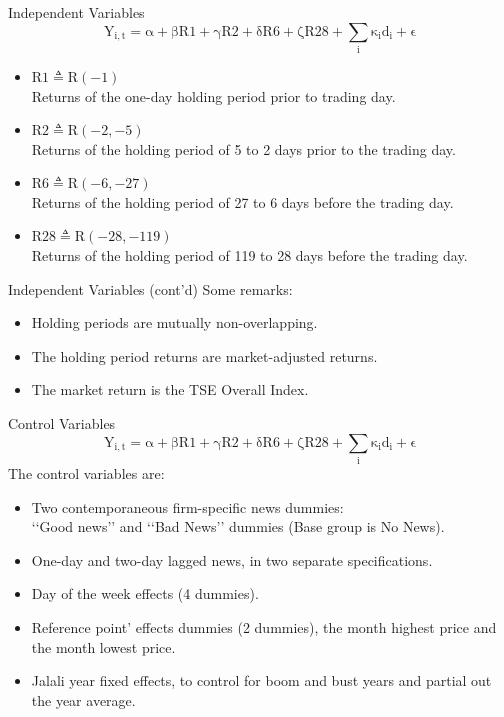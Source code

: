 \documentclass{beamer}
\begin{document}
\begin{frame}{Independent Variables}
    \[
        \mathrm{Y_{i,t} = \alpha + \beta R1 + \gamma R2 + \delta R6 + \zeta R28 + \sum_i \kappa_i d_i + \epsilon}
    \]
    \begin{itemize}
        \item \(\mathrm{R1} \triangleq   \mathrm{R(-1)} \)
              \\ Returns of the one-day holding period prior to trading day.
        \item \(\mathrm{R2} \triangleq   \mathrm{R(-2, -5)} \)
              \\ Returns of the holding period of 5 to 2 days prior to the trading day.
        \item \(\mathrm{R6} \triangleq   \mathrm{R(-6, -27)} \)
              \\ Returns of the holding period of 27 to 6 days before the trading day.
        \item \(\mathrm{R28} \triangleq  \mathrm{R(-28, -119)} \)
              \\ Returns of the holding period of 119 to 28 days before the trading day.
    \end{itemize}
\end{frame}

\begin{frame}{Independent Variables (cont'd)}
    Some remarks:
    \begin{itemize}
        \item Holding periods are mutually non-overlapping.
        \item The holding period returns are market-adjusted returns.
        \item The market return is the TSE Overall Index.
    \end{itemize}
\end{frame}

\begin{frame}{Control Variables}
    \[
        \mathrm{Y_{i,t} = \alpha + \beta R1 + \gamma R2 + \delta R6 + \zeta R28 + \sum_i \kappa_i d_i + \epsilon}
    \]
    The control variables are:
    \begin{itemize}
        \item Two contemporaneous firm-speciﬁc news dummies:\\
              ‘‘Good news’’ and ‘‘Bad News’’ dummies (Base group is No News).
        \item One-day and two-day lagged news, in two separate specifications.
        \item Day of the week effects (4 dummies).
        \item Reference point’ effects dummies (2 dummies), the month highest price and the month lowest price.
        \item Jalali year fixed effects, to control for boom and bust years and partial out the year average.
    \end{itemize}
\end{frame}
\end{document}

